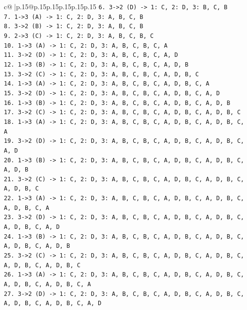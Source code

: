 \documentclass{article}
\begin{document}
{\begin{supertabular}{c@{$\;$}|p{.15\linewidth}@{}p{.15\linewidth}p{.15\linewidth}p{.15\linewidth}p{.15\linewidth}p{.15\linewidth}}
{{{\texttt{6. 3{-}>2 (D) {-}> 1: C, 2: D, 3: B, C, B} \\
\texttt{7. 1{-}>3 (A) {-}> 1: C, 2: D, 3: A, B, C, B} \\
\texttt{8. 3{-}>2 (B) {-}> 1: C, 2: D, 3: A, B, C, B} \\
\texttt{9. 2{-}>3 (C) {-}> 1: C, 2: D, 3: A, B, C, B, C} \\
\texttt{10. 1{-}>3 (A) {-}> 1: C, 2: D, 3: A, B, C, B, C, A} \\
\texttt{11. 3{-}>2 (D) {-}> 1: C, 2: D, 3: A, B, C, B, C, A, D} \\
\texttt{12. 1{-}>3 (B) {-}> 1: C, 2: D, 3: A, B, C, B, C, A, D, B} \\
\texttt{13. 3{-}>2 (C) {-}> 1: C, 2: D, 3: A, B, C, B, C, A, D, B, C} \\
\texttt{14. 1{-}>3 (A) {-}> 1: C, 2: D, 3: A, B, C, B, C, A, D, B, C, A} \\
\texttt{15. 3{-}>2 (D) {-}> 1: C, 2: D, 3: A, B, C, B, C, A, D, B, C, A, D} \\
\texttt{16. 1{-}>3 (B) {-}> 1: C, 2: D, 3: A, B, C, B, C, A, D, B, C, A, D, B} \\
\texttt{17. 3{-}>2 (C) {-}> 1: C, 2: D, 3: A, B, C, B, C, A, D, B, C, A, D, B, C} \\
\texttt{18. 1{-}>3 (A) {-}> 1: C, 2: D, 3: A, B, C, B, C, A, D, B, C, A, D, B, C, A} \\
\texttt{19. 3{-}>2 (D) {-}> 1: C, 2: D, 3: A, B, C, B, C, A, D, B, C, A, D, B, C, A, D} \\
\texttt{20. 1{-}>3 (B) {-}> 1: C, 2: D, 3: A, B, C, B, C, A, D, B, C, A, D, B, C, A, D, B} \\
\texttt{21. 3{-}>2 (C) {-}> 1: C, 2: D, 3: A, B, C, B, C, A, D, B, C, A, D, B, C, A, D, B, C} \\
\texttt{22. 1{-}>3 (A) {-}> 1: C, 2: D, 3: A, B, C, B, C, A, D, B, C, A, D, B, C, A, D, B, C, A} \\
\texttt{23. 3{-}>2 (D) {-}> 1: C, 2: D, 3: A, B, C, B, C, A, D, B, C, A, D, B, C, A, D, B, C, A, D} \\
\texttt{24. 1{-}>3 (B) {-}> 1: C, 2: D, 3: A, B, C, B, C, A, D, B, C, A, D, B, C, A, D, B, C, A, D, B} \\
\texttt{25. 3{-}>2 (C) {-}> 1: C, 2: D, 3: A, B, C, B, C, A, D, B, C, A, D, B, C, A, D, B, C, A, D, B, C} \\
\texttt{26. 1{-}>3 (A) {-}> 1: C, 2: D, 3: A, B, C, B, C, A, D, B, C, A, D, B, C, A, D, B, C, A, D, B, C, A} \\
\texttt{27. 3{-}>2 (D) {-}> 1: C, 2: D, 3: A, B, C, B, C, A, D, B, C, A, D, B, C, A, D, B, C, A, D, B, C, A, D} \\
}}}
\end{supertabular}}
\end{document}
